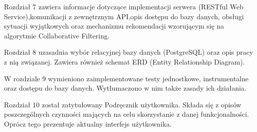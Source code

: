 \par Rozdział 7 zawiera informacje dotyczące implementacji serwera (RESTful Web Service),komunikacji z zewnętrznym API,opis dostępu do bazy danych, obsługi sytuacji wyjątkowych oraz mechanizmu rekomendacji wzorującym się na algorytmie Collaborative Filtering.

\par Rozdział 8 uzasadnia wybór relacyjnej bazy danych (PostgreSQL) oraz opis pracy z nią związanej. Zawiera również schemat ERD (Entity Relationship Diagram).

\par W rozdziale 9 wymieniono zaimplementowane testy jednostkowe, instrumentalne oraz dostępu do bazy danych. Wytłumaczono w nim także zasady ich działania.

\par Rozdział 10 został zatytułowany Podręcznik użytkownika. Składa się z opisów poszczególnych czynności mających na celu skorzystanie z danej funkcjonalności. Oprócz tego prezentuje aktualny interfejs użytkownika.
